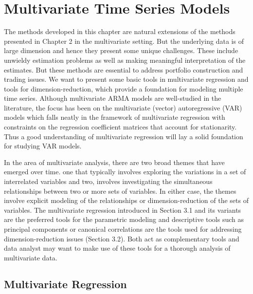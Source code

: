 
\chapter{Multivariate Time Series Models \label{ch:ch_mvts}}

The methods developed in this chapter are natural extensions of the methods presented in Chapter 2 in the multivariate setting. But the underlying data is of large dimension and hence they present some unique challenges. These include unwieldy estimation problems as well as making meaningful interpretation of the estimates. But these methods are essential to address portfolio construction and trading issues. We want to present some basic tools in multivariate regression and tools for dimension-reduction, which provide a foundation for modeling multiple time series. Although multivariate ARMA models are well-studied in the literature, the focus has been on the multivariate (vector) autoregressive (VAR) models which falls neatly in the framework of multivariate regression with constraints on the regression coefficient matrices that account for stationarity. Thus a good understanding of multivariate regression will lay a solid foundation for studying VAR models.


In the area of multivariate analysis, there are two broad themes that have emerged over time. one that typically involves exploring the variations in a set of interrelated variables and two, involves investigating the simultaneous relationships between two or more sets of variables. In either case, the themes involve explicit modeling of the relationships or dimension-reduction of the sets of variables. The multivariate regression introduced in Section 3.1 and its variants are the preferred tools for the parametric modeling and descriptive tools such as principal components or canonical correlations are the tools used for addressing dimension-reduction issues (Section 3.2). Both act as complementary tools and data analyst may want to make use of these tools for a thorough analysis of multivariate data. 


\section{Multivariate Regression} 


